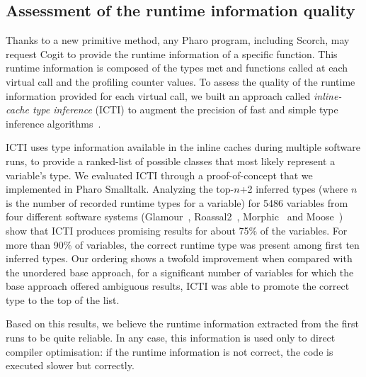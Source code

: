 \documentclass[a4paper,12pt,twoside]{../includes/ThesisStyle}
\begin{document}
\subsection{Assessment of the runtime information quality}

Thanks to a new primitive method, any Pharo program, including Scorch, may request Cogit to provide the runtime information of a specific function. This runtime information is composed of the types met and functions called at each virtual call and the profiling counter values. To assess the quality of the runtime information provided for each virtual call, we built an approach called \emph{inline-cache type inference} (ICTI) to augment the precision of fast and simple type inference algorithms~\cite{Milo16a}. 

ICTI uses type information available in the inline caches during multiple software runs, to provide a ranked-list of possible classes that most likely represent a variable's type. We evaluated ICTI through a proof-of-concept that we implemented in Pharo Smalltalk. Analyzing the top-$n$+2 inferred types (where $n$ is the number of recorded runtime types for a variable) for 5486 variables from four different software systems (Glamour~\cite{Bung09a}, Roassal2~\cite{Pena13a}, Morphic~\cite{Fern07y} and Moose~\cite{Girb10a, Duca05a, Duca00b}) show that ICTI produces promising results for about 75\% of the variables. For more than 90\% of variables, the correct runtime type was present among first ten inferred types. Our ordering shows a twofold improvement when compared with the unordered base approach, \ie for a significant number of variables for which the base approach offered ambiguous results, ICTI was able to promote the correct type to the top of the list.

Based on this results, we believe the runtime information extracted from the first runs to be quite reliable. In any case, this information is used only to direct compiler optimisation: if the runtime information is not correct, the code is executed slower but correctly.

\ifx\wholebook\relax\else
    
\end{document}
